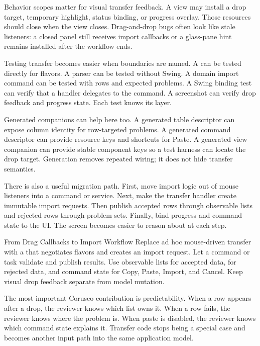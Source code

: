 Behavior scopes matter for visual transfer feedback. A view may install a drop target, temporary highlight, status binding, or progress overlay. Those resources should close when the view closes. Drag-and-drop bugs often look like stale listeners: a closed panel still receives import callbacks or a glass-pane hint remains installed after the workflow ends.

Testing transfer becomes easier when boundaries are named. A  can be tested directly for flavors. A parser can be tested without Swing. A domain import command can be tested with rows and expected problems. A Swing binding test can verify that a handler delegates to the command. A screenshot can verify drop feedback and progress state. Each test knows its layer.

Generated companions can help here too. A generated table descriptor can expose column identity for row-targeted problems. A generated command descriptor can provide resource keys and shortcuts for Paste. A generated view companion can provide stable component keys so a test harness can locate the drop target. Generation removes repeated wiring; it does not hide transfer semantics.

There is also a useful migration path. First, move import logic out of mouse listeners into a command or service. Next, make the transfer handler create immutable import requests. Then publish accepted rows through observable lists and rejected rows through problem sets. Finally, bind progress and command state to the UI. The screen becomes easier to reason about at each step.

\begin{migrationbox}{From Drag Callbacks to Import Workflow}
Replace ad hoc mouse-driven transfer with a  that negotiates flavors and creates an import request. Let a command or task validate and publish results. Use observable lists for accepted data,  for rejected data, and command state for Copy, Paste, Import, and Cancel. Keep visual drop feedback separate from model mutation.
\end{migrationbox}

The most important Corusco contribution is predictability. When a row appears after a drop, the reviewer knows which list owns it. When a row fails, the reviewer knows where the problem is. When paste is disabled, the reviewer knows which command state explains it. Transfer code stops being a special case and becomes another input path into the same application model.

